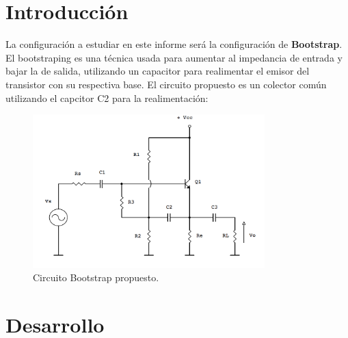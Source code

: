 \documentclass[a4paper]{article}
\begin{document}




\section{Introducción}
La configuración a estudiar en este informe será la configuración de \textbf{Bootstrap}. El bootstraping es una técnica usada para aumentar al impedancia de entrada y bajar la de salida, utilizando un capacitor para realimentar el emisor del transistor con su respectiva base. El circuito propuesto es un colector común utilizando el capcitor C2 para la realimentación:
\begin{figure} [H]
	\centering
	\includegraphics[width=0.8\textwidth]{imagenes/bootstrap.PNG}
	\caption{Circuito Bootstrap propuesto.}
	\label{fig:boot}
\end{figure}

\section{Desarrollo}
\end{document}
